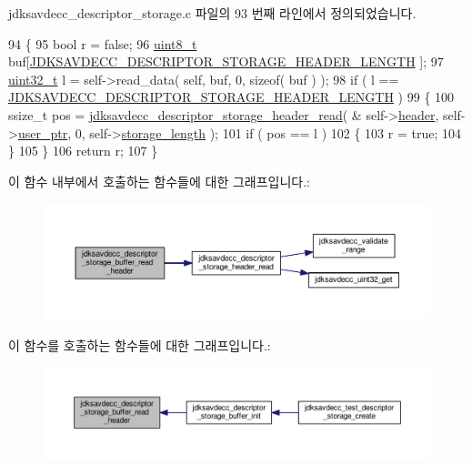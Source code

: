 jdksavdecc\+\_\+descriptor\+\_\+storage.\+c 파일의 93 번째 라인에서 정의되었습니다.


\begin{DoxyCode}
94 \{
95     \textcolor{keywordtype}{bool} r = \textcolor{keyword}{false};
96     \hyperlink{stdint_8h_aba7bc1797add20fe3efdf37ced1182c5}{uint8\_t} buf[\hyperlink{group__descriptor__storage__header_ga40ba715ff2f7643324bcd41822d75325}{JDKSAVDECC\_DESCRIPTOR\_STORAGE\_HEADER\_LENGTH}
      ];
97     \hyperlink{parse_8c_a6eb1e68cc391dd753bc8ce896dbb8315}{uint32\_t} l = \textcolor{keyword}{self}->read\_data( \textcolor{keyword}{self}, buf, 0, \textcolor{keyword}{sizeof}( buf ) );
98     \textcolor{keywordflow}{if} ( l == \hyperlink{group__descriptor__storage__header_ga40ba715ff2f7643324bcd41822d75325}{JDKSAVDECC\_DESCRIPTOR\_STORAGE\_HEADER\_LENGTH} )
99     \{
100         ssize\_t pos = \hyperlink{group__descriptor__storage__header_gab83a9f608d877f4993c043bafa430122}{jdksavdecc\_descriptor\_storage\_header\_read}( &
      self->\hyperlink{structjdksavdecc__descriptor__storage_ab5243bc10c0547b567bfe308e571200e}{header}, self->\hyperlink{structjdksavdecc__descriptor__storage_a7b014caab0b5b593d13d50f3510afbfb}{user\_ptr}, 0, self->\hyperlink{structjdksavdecc__descriptor__storage_a4c901ad7e199ca61d6cdadd2fce52b83}{storage\_length} );
101         \textcolor{keywordflow}{if} ( pos == l )
102         \{
103             r = \textcolor{keyword}{true};
104         \}
105     \}
106     \textcolor{keywordflow}{return} r;
107 \}
\end{DoxyCode}


이 함수 내부에서 호출하는 함수들에 대한 그래프입니다.\+:
\nopagebreak
\begin{figure}[H]
\begin{center}
\leavevmode
\includegraphics[width=350pt]{group__jdksavdecc__descriptor__storage_ga7c0f7088936576fa27511da7fde01a1a_cgraph}
\end{center}
\end{figure}




이 함수를 호출하는 함수들에 대한 그래프입니다.\+:
\nopagebreak
\begin{figure}[H]
\begin{center}
\leavevmode
\includegraphics[width=350pt]{group__jdksavdecc__descriptor__storage_ga7c0f7088936576fa27511da7fde01a1a_icgraph}
\end{center}
\end{figure}


